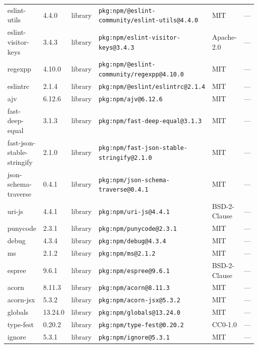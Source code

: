\documentclass[11pt,a4paper]{article}
\begin{document}
\begin{longtable}{|p{4cm}|p{2cm}|p{1.6cm}|p{5cm}|p{1.5cm}|p{3.5cm}|}
\raggedright eslint-utils & 4.4.0 & library & \small\texttt{pkg:npm/@eslint-community/eslint-utils@4.4.0} & MIT & \small — \\
\raggedright eslint-visitor-keys & 3.4.3 & library & \small\texttt{pkg:npm/eslint-visitor-keys@3.4.3} & Apache-2.0 & \small — \\
\raggedright regexpp & 4.10.0 & library & \small\texttt{pkg:npm/@eslint-community/regexpp@4.10.0} & MIT & \small — \\
\raggedright eslintrc & 2.1.4 & library & \small\texttt{pkg:npm/@eslint/eslintrc@2.1.4} & MIT & \small — \\
\raggedright ajv & 6.12.6 & library & \small\texttt{pkg:npm/ajv@6.12.6} & MIT & \small — \\
\raggedright fast-deep-equal & 3.1.3 & library & \small\texttt{pkg:npm/fast-deep-equal@3.1.3} & MIT & \small — \\
\raggedright fast-json-stable-stringify & 2.1.0 & library & \small\texttt{pkg:npm/fast-json-stable-stringify@2.1.0} & MIT & \small — \\
\raggedright json-schema-traverse & 0.4.1 & library & \small\texttt{pkg:npm/json-schema-traverse@0.4.1} & MIT & \small — \\
\raggedright uri-js & 4.4.1 & library & \small\texttt{pkg:npm/uri-js@4.4.1} & BSD-2-Clause & \small — \\
\raggedright punycode & 2.3.1 & library & \small\texttt{pkg:npm/punycode@2.3.1} & MIT & \small — \\
\raggedright debug & 4.3.4 & library & \small\texttt{pkg:npm/debug@4.3.4} & MIT & \small — \\
\raggedright ms & 2.1.2 & library & \small\texttt{pkg:npm/ms@2.1.2} & MIT & \small — \\
\raggedright espree & 9.6.1 & library & \small\texttt{pkg:npm/espree@9.6.1} & BSD-2-Clause & \small — \\
\raggedright acorn & 8.11.3 & library & \small\texttt{pkg:npm/acorn@8.11.3} & MIT & \small — \\
\raggedright acorn-jsx & 5.3.2 & library & \small\texttt{pkg:npm/acorn-jsx@5.3.2} & MIT & \small — \\
\raggedright globals & 13.24.0 & library & \small\texttt{pkg:npm/globals@13.24.0} & MIT & \small — \\
\raggedright type-fest & 0.20.2 & library & \small\texttt{pkg:npm/type-fest@0.20.2} & CC0-1.0 & \small — \\
\raggedright ignore & 5.3.1 & library & \small\texttt{pkg:npm/ignore@5.3.1} & MIT & \small — \\

\end{longtable}
\end{document}
